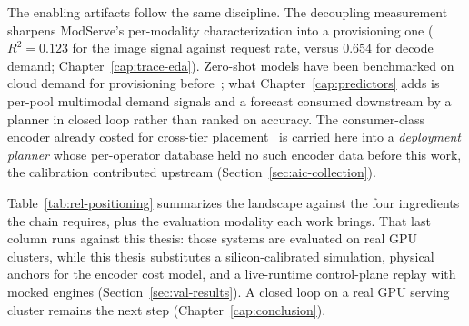 The enabling artifacts follow the same discipline. The decoupling
measurement sharpens ModServe's per-modality characterization into a
provisioning one ($R^2 = \num{0.123}$ for the image signal against
request rate, versus $\num{0.654}$ for decode demand;
Chapter~\ref{cap:trace-eda}). Zero-shot models have been benchmarked on
cloud demand for provisioning
before~\cite{Diao2024Forecasting,Toner2025ZeroShot}; what
Chapter~\ref{cap:predictors} adds is per-pool multimodal demand signals
and a forecast consumed downstream by a planner in closed loop rather
than ranked on accuracy. The consumer-class encoder already costed
for cross-tier
placement~\cite{Yu2026HeteroServe} is carried here into a
\emph{deployment planner} whose per-operator database held no such
encoder data before this work, the calibration contributed upstream
(Section~\ref{sec:aic-collection}).

Table~\ref{tab:rel-positioning} summarizes the landscape against the
four ingredients the chain requires, plus the evaluation modality each
work brings. That last column runs against this thesis: those
systems are evaluated on real GPU clusters, while this thesis
substitutes a silicon-calibrated simulation, physical anchors for the
encoder cost model, and a live-runtime control-plane replay with mocked
engines (Section~\ref{sec:val-results}). A closed loop on a real GPU
serving cluster remains the next step (Chapter~\ref{cap:conclusion}).

